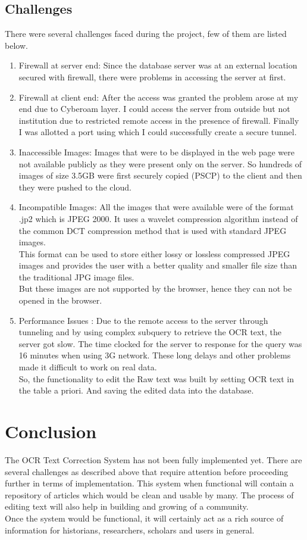 \documentclass[amsart, 12pt]{article}
\begin{document}
\subsection{Challenges}
There were several challenges faced during the project, few of them are listed below.
\begin{enumerate}
\item Firewall at server end: Since the database server was at an external location secured with firewall, there were problems in accessing the server at first.
\item Firewall at client end: After the access was granted the problem arose at my end due to Cyberoam layer. I could access the server from outside but not institution due to restricted remote access in the presence of firewall. Finally I was allotted a port using which I could successfully create a secure tunnel.
\item Inaccessible Images: Images that were to be displayed in the web page were not available publicly as they were present only on the server. So hundreds of images of size 3.5GB were first securely copied (PSCP) to the client and then they were pushed to the cloud.
\item Incompatible Images: All the images that were available were of the format .jp2 which is JPEG 2000. It uses a wavelet compression algorithm instead of the common DCT compression method that is used with standard JPEG images.\\
This format can be used to store either lossy or lossless compressed JPEG images and provides the user with a better quality and smaller file size than the traditional JPG image files.\\
But these images are not supported by the browser, hence they can not be opened in the browser.
\item Performance Issues : Due to the remote access to the server through tunneling and by using complex subquery to retrieve the OCR text, the server got slow. The time clocked for the server to response for the query was 16 minutes when using 3G network. These long delays and other problems made it difficult to work on real data. \\
So, the functionality to edit the Raw text was built by setting OCR text in the table a priori. And saving the edited data into the database.

\end{enumerate}

\section{Conclusion}
The OCR \cite{OCR} Text Correction System has not been fully implemented yet. There are several challenges as described above that require attention before proceeding further in terms of implementation. This system when functional will contain a repository of articles which would be clean and usable by many. The process of editing text will also help in building and growing of a community.\\
Once the system would be functional, it will certainly act as a rich source of information for historians, researchers, scholars and users in general.\\
\end{document}
